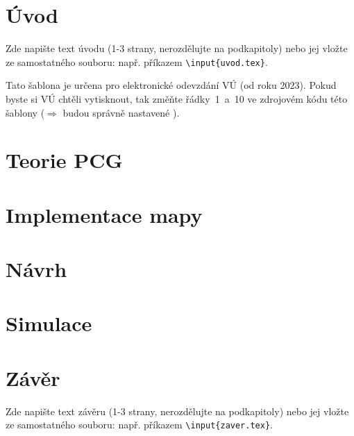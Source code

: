 \documentclass[a4paper,oneside,czech,12pt]{book} %
\newcommand{\ti}{\textit} %
\begin{document}
\parskip=0pt
\tableofcontents %
\parskip=7pt



\chapter*{Úvod} %
%
Zde napište text úvodu (1-3 strany, nerozdělujte na podkapitoly) nebo jej vložte ze samostatného souboru: např. příkazem \texttt{\textbackslash input\{uvod.tex\}}.

Tato šablona je určena {\color{red}pro elektronické odevzdání VÚ} (od roku 2023). Pokud byste si VÚ chtěli vytisknout, tak změňte řádky~1~a~10 ve zdrojovém kódu této šablony ($\Rightarrow$ budou správně nastavené ).
%
%


\chapter{Teorie PCG}


\chapter{Implementace mapy}


\chapter{Návrh}


\chapter{Simulace}


\chapter*{Závěr}
%
Zde napište text závěru (1-3 strany, nerozdělujte na podkapitoly) nebo jej vložte ze samostatného souboru: např. příkazem \texttt{\textbackslash input\{zaver.tex\}}.
%
%


\end{document}
